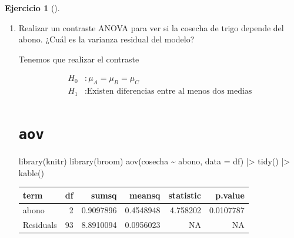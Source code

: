 \documentclass[
  a4paper,
]{scrreport}
\newenvironment{Shaded}{\begin{snugshade}}{\end{snugshade}}
\newcommand{\AttributeTok}[1]{\textcolor[rgb]{0.40,0.45,0.13}{#1}}
\newcommand{\FunctionTok}[1]{\textcolor[rgb]{0.28,0.35,0.67}{#1}}
\newcommand{\NormalTok}[1]{\textcolor[rgb]{0.00,0.23,0.31}{#1}}
\newcommand{\SpecialCharTok}[1]{\textcolor[rgb]{0.37,0.37,0.37}{#1}}
\theoremstyle{definition}
\newtheorem{exercise}{Ejercicio}[chapter]
\theoremstyle{remark}
\begin{document}
\begin{exercise}[]
\begin{enumerate}
\begin{tcolorbox}
  \end{tcolorbox}
\item
  Realizar un contraste ANOVA para ver si la cosecha de trigo depende
  del abono. ¿Cuál es la varianza residual del modelo?

  \begin{tcolorbox}[enhanced jigsaw, colframe=quarto-callout-tip-color-frame, toprule=.15mm, bottomtitle=1mm, breakable, opacitybacktitle=0.6, toptitle=1mm, colback=white, bottomrule=.15mm, title=\textcolor{quarto-callout-tip-color}{\faLightbulb}\hspace{0.5em}{Solución}, arc=.35mm, left=2mm, titlerule=0mm, rightrule=.15mm, coltitle=black, leftrule=.75mm, opacityback=0, colbacktitle=quarto-callout-tip-color!10!white]

  Tenemos que realizar el contraste

  \begin{align*}
  H_0 &: \mu_A = \mu_B = \mu_C \\
  H_1 &: \mbox{Existen diferencias entre al menos dos medias}
  \end{align*}

  \section{\texorpdfstring{\texttt{aov}}{aov}}

\begin{Shaded}
\begin{Highlighting}[]
\FunctionTok{library}\NormalTok{(knitr)}
\FunctionTok{library}\NormalTok{(broom)}
\FunctionTok{aov}\NormalTok{(cosecha }\SpecialCharTok{\textasciitilde{}}\NormalTok{ abono, }\AttributeTok{data =}\NormalTok{ df) }\SpecialCharTok{|\textgreater{}} 
    \FunctionTok{tidy}\NormalTok{() }\SpecialCharTok{|\textgreater{}} 
    \FunctionTok{kable}\NormalTok{()}
\end{Highlighting}
\end{Shaded}

  \begin{longtable}[]{@{}lrrrrr@{}}
  \toprule\noalign{}
  term & df & sumsq & meansq & statistic & p.value \\
  \midrule\noalign{}
  \endhead
  \bottomrule\noalign{}
  \endlastfoot
  abono & 2 & 0.9097896 & 0.4548948 & 4.758202 & 0.0107787 \\
  Residuals & 93 & 8.8910094 & 0.0956023 & NA & NA \\
  \end{longtable}


\end{tcolorbox}
\end{enumerate}
\end{exercise}
\end{document}

